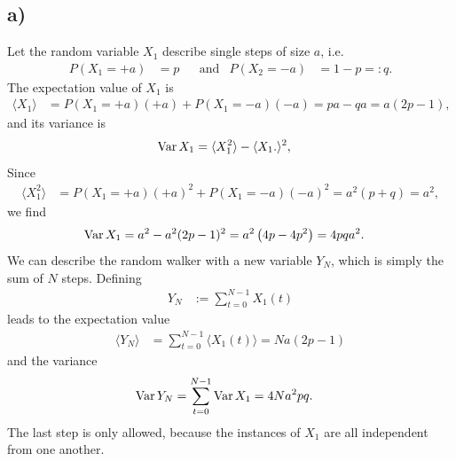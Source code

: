 \documentclass[english, parskip=full]{scrartcl}
\newcommand{\bra}{}
\newcommand{\kla}{}
\newcommand{\tecxt}{}
\begin{document}
\subsection*{a)}
Let the random variable $X_1$ describe single steps of size $a$, i.e.
\begin{align}
P(X_1=+a)&=p&&\tecxt\text{and}&P(X_2=-a)&=1-p=:q.
\end{align}
The expectation value of $X_1$ is
\begin{align}
\bra\langle X_1 \rangle&=P(X_1=+a)(+a)+P(X_1=-a)(-a)=pa-qa=a(2p-1),
\end{align}
and its variance is
\begin{align}
\tecxt\text{Var\,}X_1&=\bra\langle X_1^2 \rangle-\bra\langle X_1.\rangle^2,
\end{align}
Since
\begin{align}
\bra\langle X_1^2 \rangle&=P(X_1=+a)(+a)^2+P(X_1=-a)(-a)^2=a^2\kla\left( p+q \right)=a^2,
\end{align}
we find
\begin{align}
\tecxt\text{Var\,}X_1&=a^2-a^2(2p-1)^2=a^2\kla\left( 4p-4p^2 \right)=4pqa^2.
\end{align}
We can describe the random walker with a new variable $Y_N$, which is simply the sum of $N$ steps. 
Defining
\begin{align}
Y_N&:=\sum_{t=0}^{N-1}X_1(t)
\end{align} 
leads to the expectation value
\begin{align}
\bra\langle Y_N \rangle&=\sum_{t=0}^{N-1}\bra\langle X_1(t) \rangle=Na(2p-1)
\end{align}
and the variance
\begin{align}
\tecxt\text{Var\,}Y_N&=\sum_{t=0}^{N-1}\tecxt\text{Var\,}X_1=4Na^2pq.
\end{align}
The last step is only allowed, because the instances of $X_1$ are all independent from one another.
\end{document}
